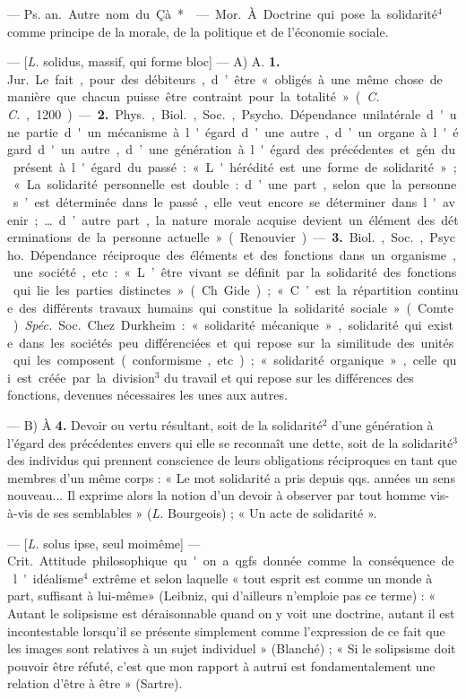 \begin{itemize}[leftmargin=1cm, label=, itemsep=1pt]
 — \si{Ps. an.} Autre nom du Çà*.

 — \si{Mor.} À. Doctrine qui
pose la solidarité$^4$ comme principe
de la morale, de la politique et de
l’économie sociale.

 — [{\it L.} solidus, massif, qui
forme bloc] — A) A. {\bf 1.} \si{Jur.} Le fait,
pour des débiteurs, d’être « obligés
à une même chose de manière que
chacun puisse être contraint pour
la totalité » ({\it C. C.}, 1200). — {\bf 2.} \si{Phys.},
\si{Biol.}, \si{Soc.}, \si{Psycho.} Dépendance
unilatérale d'une partie d'un mécanisme à l'égard d’une autre, d’un
organe à l'égard d'un autre, d’une
génération à l'égard des précédentes
et gén. du présent à l'égard du
passé : « L'hérédité est une forme de
solidarité »; « La solidarité personnelle est double : d’une part, selon
que la personne s’est déterminée
dans le passé, elle veut encore se
déterminer dans l'avenir; … d’autre
part, la nature morale acquise devient un élément des déterminations de la personne actuelle » (Renouvier). — {\bf 3.} \si{Biol.}, \si{Soc.}, \si{Psycho.}
Dépendance réciproque des éléments
et des fonctions dans un organisme,
une société, etc. : « L’être vivant se
définit par la solidarité des fonctions
qui lie les parties distinctes »
(Ch. Gide) ; « C’est la répartition
continue des différents travaux
humains qui constitue la solidarité
sociale » (Comte). {\it Spéc.} \si{Soc.} Chez
Durkheim : « solidarité mécanique »,
solidarité qui existe dans les sociétés
peu différenciées et qui repose sur
la similitude des unités qui les composent (conformisme, etc.) ; « solidarité organique », celle qui est créée
par la division$^3$ du travail et qui
repose sur les différences des fonctions,
devenues nécessaires les unes aux autres.

— B) À {\bf 4.} Devoir ou vertu résultant, soit de la solidarité$^2$ d’une
génération à l'égard des précédentes
envers qui elle se reconnaît une
dette, soit de la solidarité$^3$ des individus qui prennent conscience de
leurs obligations réciproques en tant
que membres d’un même corps :
« Le mot solidarité a pris depuis
qqs. années un sens nouveau... Il
exprime alors la notion d’un devoir
à observer par tout homme vis-à-vis
de ses semblables » ({\it L.} Bourgeois) ;
« Un acte de solidarité ».

 — [{\it L.} solus ipse, seul moimême] — \si{Crit.} Attitude philosophique qu'on a qgfs. donnée
comme la conséquence de l'idéalisme$^4$ extrême et selon laquelle
« tout esprit est comme un monde à
part, suffisant à lui-même» (Leibniz,
qui d’ailleurs n’emploie pas ce
terme) : « Autant le solipsisme est
déraisonnable quand on y voit une
doctrine, autant il est incontestable lorsqu'il se présente simplement comme l'expression de ce fait
que les images sont relatives à un
sujet individuel » (Blanché) ; « Si le
solipsisme doit pouvoir être réfuté,
c'est que mon rapport à autrui est
fondamentalement une relation
d’être à être » (Sartre).


\end{itemize}

